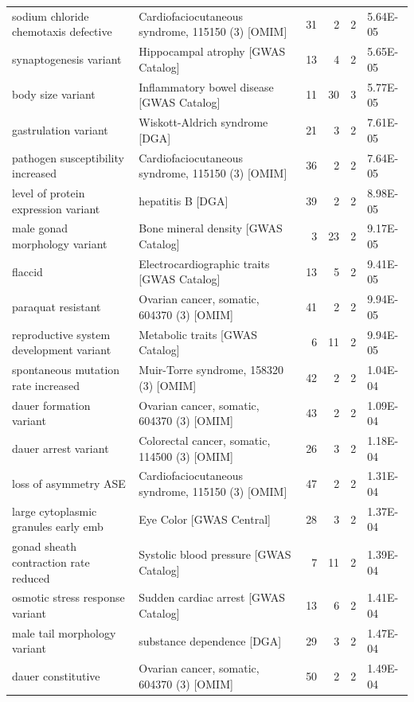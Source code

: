 \begin{table}
\begin{tabulary}{\linewidth}{LLRRRL}
  sodium chloride chemotaxis defective & Cardiofaciocutaneous syndrome, 115150 (3) [OMIM] & 31 & 2 & 2 & 5.64E-05 \\
  synaptogenesis variant & Hippocampal atrophy [GWAS Catalog] & 13 & 4 & 2 & 5.65E-05 \\
  body size variant & Inflammatory bowel disease [GWAS Catalog] & 11 & 30 & 3 & 5.77E-05 \\
  gastrulation variant & Wiskott-Aldrich syndrome [DGA] & 21 & 3 & 2 & 7.61E-05 \\
  pathogen susceptibility increased & Cardiofaciocutaneous syndrome, 115150 (3) [OMIM] & 36 & 2 & 2 & 7.64E-05 \\
  level of protein expression variant & hepatitis B [DGA] & 39 & 2 & 2 & 8.98E-05 \\
  male gonad morphology variant & Bone mineral density [GWAS Catalog] & 3 & 23 & 2 & 9.17E-05 \\
  flaccid & Electrocardiographic traits [GWAS Catalog] & 13 & 5 & 2 & 9.41E-05 \\
  paraquat resistant & Ovarian cancer, somatic, 604370 (3) [OMIM] & 41 & 2 & 2 & 9.94E-05 \\
  reproductive system development variant & Metabolic traits [GWAS Catalog] & 6 & 11 & 2 & 9.94E-05 \\
  spontaneous mutation rate increased & Muir-Torre syndrome, 158320 (3) [OMIM] & 42 & 2 & 2 & 1.04E-04 \\
  dauer formation variant & Ovarian cancer, somatic, 604370 (3) [OMIM] & 43 & 2 & 2 & 1.09E-04 \\
  dauer arrest variant & Colorectal cancer, somatic, 114500 (3) [OMIM] & 26 & 3 & 2 & 1.18E-04 \\
  loss of asymmetry ASE & Cardiofaciocutaneous syndrome, 115150 (3) [OMIM] & 47 & 2 & 2 & 1.31E-04 \\
  large cytoplasmic granules early emb & Eye Color [GWAS Central] & 28 & 3 & 2 & 1.37E-04 \\
  gonad sheath contraction rate reduced & Systolic blood pressure [GWAS Catalog] & 7 & 11 & 2 & 1.39E-04 \\
  osmotic stress response variant & Sudden cardiac arrest [GWAS Catalog] & 13 & 6 & 2 & 1.41E-04 \\
  male tail morphology variant & substance dependence [DGA] & 29 & 3 & 2 & 1.47E-04 \\
  dauer constitutive & Ovarian cancer, somatic, 604370 (3) [OMIM] & 50 & 2 & 2 & 1.49E-04 \\  

\end{tabulary}
\end{table}

